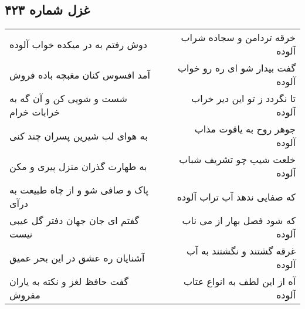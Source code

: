 \begin{center}
\section*{غزل شماره ۴۲۳}
\label{sec:sh423}
\begin{longtable}{l p{0.5cm} r}
دوش رفتم به در میکده خواب آلوده
&&
خرقه تردامن و سجاده شراب آلوده
\\
آمد افسوس کنان مغبچه باده فروش
&&
گفت بیدار شو ای ره رو خواب آلوده
\\
شست و شویی کن و آن گه به خرابات خرام
&&
تا نگردد ز تو این دیر خراب آلوده
\\
به هوای لب شیرین پسران چند کنی
&&
جوهر روح به یاقوت مذاب آلوده
\\
به طهارت گذران منزل پیری و مکن
&&
خلعت شیب چو تشریف شباب آلوده
\\
پاک و صافی شو و از چاه طبیعت به درآی
&&
که صفایی ندهد آب تراب آلوده
\\
گفتم ای جان جهان دفتر گل عیبی نیست
&&
که شود فصل بهار از می ناب آلوده
\\
آشنایان ره عشق در این بحر عمیق
&&
غرقه گشتند و نگشتند به آب آلوده
\\
گفت حافظ لغز و نکته به یاران مفروش
&&
آه از این لطف به انواع عتاب آلوده
\\
\end{longtable}
\end{center}
